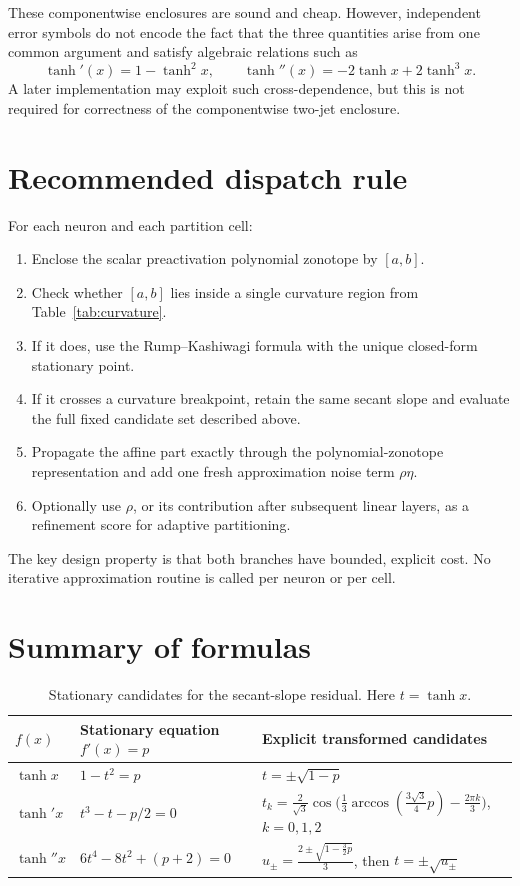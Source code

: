 \documentclass[11pt]{article}
\begin{document}
These componentwise enclosures are sound and cheap. However, independent error symbols do not encode the fact that the three quantities arise from one common argument and satisfy algebraic relations such as
\[
  \tanh'(x)=1-\tanh^2x,
  \qquad
  \tanh''(x)=-2\tanh x+2\tanh^3x.
\]
A later implementation may exploit such cross-dependence, but this is not required for correctness of the componentwise two-jet enclosure.

\section{Recommended dispatch rule}

For each neuron and each partition cell:
\begin{enumerate}[leftmargin=2em]
  \item Enclose the scalar preactivation polynomial zonotope by \([a,b]\).
  \item Check whether \([a,b]\) lies inside a single curvature region from Table~\ref{tab:curvature}.
  \item If it does, use the Rump--Kashiwagi formula with the unique closed-form stationary point.
  \item If it crosses a curvature breakpoint, retain the same secant slope and evaluate the full fixed candidate set described above.
  \item Propagate the affine part exactly through the polynomial-zonotope representation and add one fresh approximation noise term \(\rho\eta\).
  \item Optionally use \(\rho\), or its contribution after subsequent linear layers, as a refinement score for adaptive partitioning.
\end{enumerate}

The key design property is that both branches have bounded, explicit cost. No iterative approximation routine is called per neuron or per cell.

\section{Summary of formulas}

\begin{table}[ht]
\centering
\caption{Stationary candidates for the secant-slope residual. Here \(t=\tanh x\).}
\renewcommand{\arraystretch}{1.35}
\begin{tabular}{p{} p{} p{}}
\toprule
\(f(x)\) & Stationary equation \(f'(x)=p\) & Explicit transformed candidates \\
\midrule
\(\tanh x\)
& \(1-t^2=p\)
& \(t=\pm\sqrt{1-p}\) \\
\(\tanh' x\)
& \(t^3-t-p/2=0\)
& \(t_k=\frac{2}{\sqrt3}\cos\!\bigl(\frac13\arccos(\frac{3\sqrt3}{4}p)-\frac{2\pi k}{3}\bigr)\), \(k=0,1,2\) \\
\(\tanh''x\)
& \(6t^4-8t^2+(p+2)=0\)
& \(u_\pm=\frac{2\pm\sqrt{1-\frac32p}}{3}\), then \(t=\pm\sqrt{u_\pm}\) \\
\bottomrule
\end{tabular}
\end{table}
\end{document}
